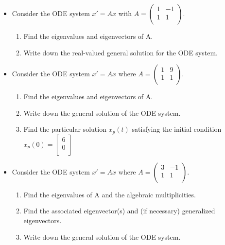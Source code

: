 \documentclass{article}
\begin{document}
\begin{itemize}
\begin{enumerate}
	\item Find the single eigenvalue, an associated eigenvector, and then a solution for the ODE system.
	\item Find the double eigenvalue, an associated eigenvector, and then a solution for the ODE system.
	\item For the double eigenvalue, find a generalized eigenvector, then use it to get another solution for the ODE system.
\end{enumerate}

\item Consider the ODE system $x'=Ax$ with $
	A=\begin{pmatrix}
		1 & -1\\
		1 &  1\\
	\end{pmatrix}
$.

\begin{enumerate}
	\item Find the eigenvalues and eigenvectors of A.
	\item Write down the real-valued general solution for the ODE system.
\end{enumerate}

\item Consider the ODE system $x'=Ax$ where $
	A=\begin{pmatrix}
		 1 & 9\\
		 1 & 1\\
	\end{pmatrix}
$.

\begin{enumerate}
	\item Find the eigenvalues and eigenvectors of A.
	\item Write down the general solution of the ODE system.
	\item Find the particular solution $x_p(t)$ satisfying the initial
		condition $x_p(0)=\begin{bmatrix} 6\\ 0 \\ \end{bmatrix}$
\end{enumerate}

\item Consider the ODE system $x'=Ax$ where $
	A=\begin{pmatrix}
		 3 & -1\\
		 1 &  1\\
	\end{pmatrix}
$.

\begin{enumerate}
	\item Find the eigenvalues of A and the algebraic multiplicities.
	\item Find the associated eigenvector(s) and (if necessary) generalized
		eigenvectors.
	\item Write down the general solution of the ODE system.
\end{enumerate}

\end{itemize}
\end{document}
